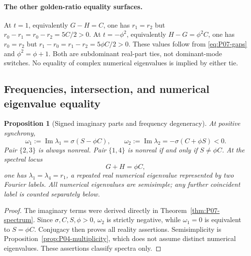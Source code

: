 \documentclass[11pt]{article}
\DeclareMathOperator{\Imm}{Im}
\newtheorem{proposition}[theorem]{Proposition}
\theoremstyle{definition}
\theoremstyle{remark}
\begin{document}
\paragraph{The other golden-ratio equality surfaces.}
At $t=1$, equivalently $G-H=C$, one has $r_1=r_2$ but
$r_0-r_1=r_0-r_2=5C/2>0$. At $t=-\phi^2$, equivalently
$H-G=\phi^2C$, one has $r_0=r_2$ but
$r_1-r_0=r_1-r_2=5\phi C/2>0$.
These values follow from \eqref{eq:P07-gaps} and $\phi^2=\phi+1$.
Both are subdominant real-part ties, not dominant-mode switches.
No equality of complex numerical eigenvalues is implied by either tie.

\subsection{Frequencies, intersection, and numerical eigenvalue equality}
\begin{proposition}[Signed imaginary parts and frequency degeneracy]
\label{prop:P07-frequency}
At positive synchrony,
\begin{equation}
 \omega_1:=\Imm\lambda_1=\sigma(S-\phi C),\qquad
 \omega_2:=\Imm\lambda_2=-\sigma(C+\phi S)<0.
 \label{eq:P07-frequency}
\end{equation}
Pair $\{2,3\}$ is always nonreal. Pair $\{1,4\}$ is nonreal
if and only if $S\ne\phi C$. At the spectral locus
\begin{equation}
 \boxed{G+H=\phi C,}\label{eq:P07-frequency-locus}
\end{equation}
one has $\lambda_1=\lambda_4=r_1$, a repeated real numerical
 eigenvalue represented by two Fourier labels. All numerical eigenvalues
are semisimple; any further coincident label is counted separately below.
\end{proposition}
\begin{proof}
The imaginary terms were derived directly in Theorem~\ref{thm:P07-spectrum}.
Since $\sigma,C,S,\phi>0$, $\omega_2$ is strictly negative, while
$\omega_1=0$ is equivalent to $S=\phi C$. Conjugacy then proves
all reality assertions. Semisimplicity is
Proposition~\ref{prop:P04-multiplicity}, which does not assume distinct
 numerical eigenvalues. These assertions classify spectra only.
\end{proof}
\end{document}
